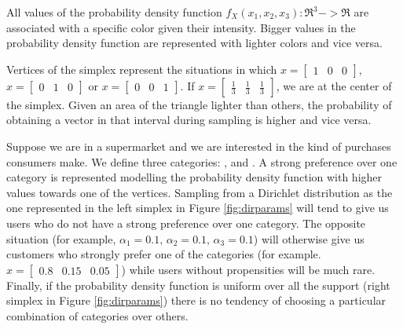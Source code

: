 All values of the probability density function $f_X(x_1, x_2, x_3): \Re^3 -> \Re$ are associated with a specific color given their intensity.
Bigger values in the probability density function are represented with lighter colors and vice versa.

Vertices of the simplex represent the situations in which $x = \begin{bmatrix}1 & 0 & 0 \end{bmatrix}$, $x = \begin{bmatrix}0 & 1 & 0 \end{bmatrix}$ or $x = \begin{bmatrix}0 & 0 & 1 \end{bmatrix}$.
If $x = \begin{bmatrix}\frac{1}{3} & \frac{1}{3} & \frac{1}{3} \end{bmatrix}$, we are at the center of the simplex.
Given an area of the triangle lighter than others, the probability of obtaining a vector in that interval during sampling is higher and vice versa.

Suppose we are in a supermarket and we are interested in the kind of purchases consumers make.
We define three categories: ,  and .
A strong preference over one category is represented modelling the probability density function with higher values towards one of the vertices.
Sampling from a Dirichlet distribution as the one represented in the left simplex in Figure \ref{fig:dirparams} will tend to give us users who do not have a strong preference over one category.
The opposite situation (for example, $\alpha_1=0.1, \, \alpha_2=0.1, \, \alpha_3=0.1$) will otherwise give us customers who strongly prefer one of the categories (for example. $x = \begin{bmatrix}0.8 & 0.15 & 0.05 \end{bmatrix}$) while users without propensities will be much rare.
Finally, if the probability density function is uniform over all the support (right simplex in Figure \ref{fig:dirparams}) there is no tendency of choosing a particular combination of categories over others.

